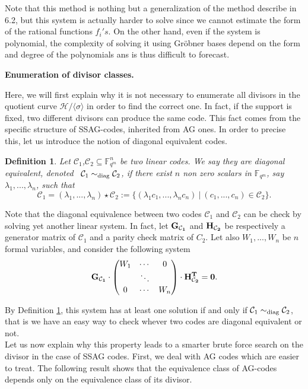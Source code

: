 \documentclass[10pt]{article}
\newtheorem{def1}[thm]{Definition}
\newcommand{\s}{\vspace{0.3cm}}
\newcommand{\cd}{\cdot}
\newcommand{\C}{\mathcal{C}}
\newcommand{\fqm}{\mathbb{F}_{q^m}}
\newcommand{\su}{\subseteq}
\begin{document}
Note that this method is nothing but a generalization of the method describe in 6.2, but this system is actually harder to solve since we cannot estimate the form of the rational functions $f_i's$. On the other hand, even if the system is polynomial, the complexity of solving it using Gröbner bases depend on the form and degree of the polynomials ans is thus difficult to forecast.

\s

\textbf{Enumeration of divisor classes.} 

\s

Here, we will first explain why it is not necessary to enumerate all divisors in the quotient curve $\mathcal{H}/ \langle \sigma \rangle$ in order to find the correct one. In fact, if the support is fixed, two different divisors can produce the same code. This fact comes from the specific structure of SSAG-codes, inherited from AG ones. In order to precise this, let us introduce the notion of diagonal equivalent codes.

\s

\begin{def1} \label{diag}
Let $\C_1$,$\C_2 \su \fqm^n$ be two linear codes. We say they are diagonal equivalent, denoted \ $\C_1 \sim_{\rm diag} \C_2$, if there exist $n$ non zero scalars in $\fqm$, say $\lambda_1,...,\lambda_n$, such that 
\[\C_1 = (\lambda_1,...,\lambda_n) \star \C_2 := \{(\lambda_1c_1,...,\lambda_nc_n) \ | \ (c_1,...,c_n) \in \C_2\}.\]
\end{def1} 

Note that the diagonal equivalence between two codes $\C_1$ and $\C_2$ can be check by solving yet another linear system. In fact, let $\bf{G}_{\C_1}$ and $\bf{H}_{\C_2}$ be respectively a generator matrix of $\C_1$ and a parity check matrix of $C_2$. Let also $W_1,...,W_n$ be $n$ formal variables, and consider the following system
\begin{equation} \label{equiv}
\bf{G}_{\C_1} \cd \begin{pmatrix}
W_1 & \cdots & 0 \\
\null & \ddots & \null \\
0 & \cdots & W_n
\end{pmatrix} \cd \mathbf{H}_{\C_2}^{T} = 0.
\end{equation}

By Definition \ref{diag}, this system has at least one solution if and only if $\C_1 \sim_{\rm diag} \C_2$, that is we have an easy way to check whever two codes are diagonal equivalent or not. \\
Let us now explain why this property leads to a smarter brute force search on the divisor in the case of SSAG codes. First, we deal with AG codes which are easier to treat. The following result shows that the equivalence class of AG-codes depends only on the equivalence class of its divisor.
\end{document}
